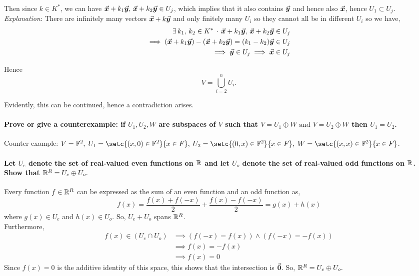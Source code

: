 \documentclass[MathsNotesBase.tex]{subfiles}
\begin{document}
		Then since $ k\in K^* $, we can have $ \vec{\bm{x}} + k_1\vec{\bm{y}},\, \vec{\bm{x}} + k_2\vec{\bm{y}} \in U_j $, which implies that it also contains $ \vec{\bm{y}} $ and hence also $ \vec{\bm{x}} $, hence $ U_1\subset U_j $.\\
		
		\textit{Explanation}: There are infinitely many vectors $\vec{\bm{x}} + k\vec{\bm{y}}$ and only finitely many $U_i$ so they cannot all be in different $U_i$ so we have,
		\begin{align*}
		\exists \, k_1,\, k_2 \in K^* \,\cdot\,  \vec{\bm{x}} + k_1\vec{\bm{y}},\, \vec{\bm{x}} + k_2\vec{\bm{y}} \in U_j \\
		\implies (\vec{\bm{x}} + k_1\vec{\bm{y}}) - (\vec{\bm{x}} + k_2\vec{\bm{y}}) = (k_1 - k_2)\vec{\bm{y}} \in U_j \\
		\implies \vec{\bm{y}} \in U_j \implies \vec{\bm{x}} \in U_j
		\end{align*}
		
		Hence
		\[ V=\bigcup_{i=2}^n U_i. \]
		
		Evidently, this can be continued, hence a contradiction arises.\\

	
	\paragraph{\small{Prove or give a counterexample: if $U_1, U_2, W$ are subspaces of $V$ such that $ V = U_1 \oplus W \text{ and } V = U_2 \oplus W $ then $U_1 = U_2$.}}
		Counter example: $V = \F{2}, \; U_1 = \setc{(x, 0) \in \F{2}}{x \in F}, \; U_2 = \setc{(0, x) \in \F{2}}{x \in F}, \; W = \setc{(x, x) \in \F{2}}{x \in F}$.

	
	\bigskip
	\paragraph{\small{Let $U_e$ denote the set of real-valued even functions on $\mathbb{R}^{}$ and let $U_o$ denote the set of real-valued odd functions on $\mathbb{R}^{}$. Show that $\mathbb{R}^{R} = U_e \oplus U_o.$}}
		Every function $f \in \mathbb{R}^{R}$ can be expressed as the sum of an even function and an odd function as,
		\[ f(x) = \frac{f(x) + f(-x)}{2} + \frac{f(x) - f(-x)}{2} = g(x) + h(x) \]
	where $g(x) \in U_e$ and $h(x) \in U_o$. So, $U_e + U_o$ spans $\mathbb{R}^{R}$.\\
	Furthermore,
	\begin{align*}
	f(x) \in (U_e \cap U_o) &\implies (f(-x) = f(x)) \wedge (f(-x) = -f(x))\\
	&\implies f(x) = -f(x)\\
	&\implies f(x) = 0
	\end{align*}
	Since $f(x) = 0$ is the additive identity of this space, this shows that the intersection is $ \vec{\bm{0}} $. So, $\mathbb{R}^{R} = U_e \oplus U_o.$
\end{document}
